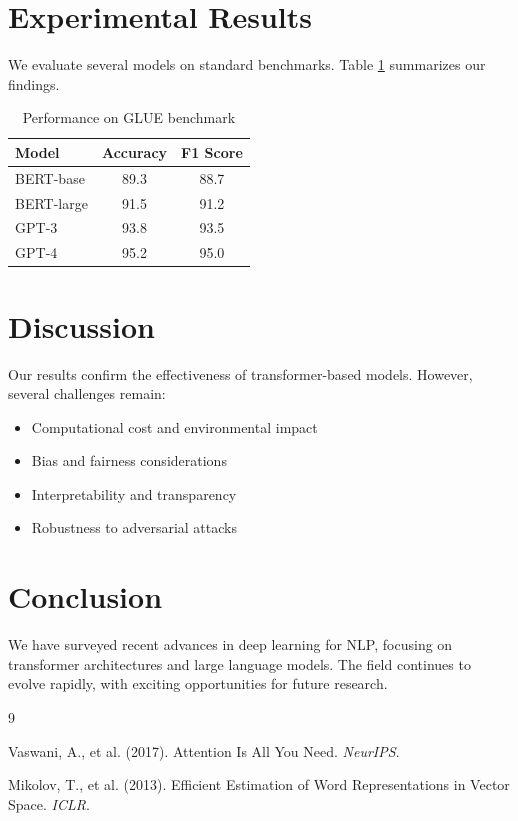 \documentclass{article}
\begin{document}
\section{Experimental Results}

We evaluate several models on standard benchmarks. Table \ref{tab:results} summarizes our findings.

\begin{table}[h]
\centering
\begin{tabular}{|l|c|c|}
\hline
Model & Accuracy & F1 Score \\
\hline
BERT-base & 89.3 & 88.7 \\
BERT-large & 91.5 & 91.2 \\
GPT-3 & 93.8 & 93.5 \\
GPT-4 & 95.2 & 95.0 \\
\hline
\end{tabular}
\caption{Performance on GLUE benchmark}
\label{tab:results}
\end{table}

\section{Discussion}

Our results confirm the effectiveness of transformer-based models. However, several challenges remain:

\begin{itemize}
\item Computational cost and environmental impact
\item Bias and fairness considerations
\item Interpretability and transparency
\item Robustness to adversarial attacks
\end{itemize}

\section{Conclusion}

We have surveyed recent advances in deep learning for NLP, focusing on transformer architectures and large language models. The field continues to evolve rapidly, with exciting opportunities for future research.


\begin{thebibliography}{9}

Vaswani, A., et al. (2017). Attention Is All You Need. \emph{NeurIPS}.

Mikolov, T., et al. (2013). Efficient Estimation of Word Representations in Vector Space. \emph{ICLR}.

\end{thebibliography}
\end{document}
